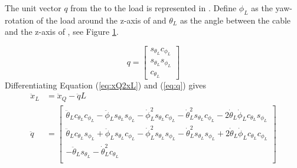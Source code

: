 The unit vector $ q $ from the  to the load is represented in \BF. Define $ \phi_L $ as the yaw-rotation of the load around the z-axis of \BF and $ \theta_L $ as the angle between the cable and the z-axis of \BF, see Figure \ref{fig:mod.modelQRLtrad}.
\begin{figure}[h!]
	\centering
	\caption{\label{fig:mod.modelQRLtrad}}
\end{figure}	

\begin{equation}\label{eq:q}
q=\begin{bmatrix}
s_{\theta_L}c_{\phi_L}\\
s_{\theta_L}s_{\phi_L}\\
c_{\theta_L}
\end{bmatrix}
\end{equation}  
Differentiating Equation (\ref{eq:xQ2xL}) and (\ref{eq:q}) gives
\begin{equation}\label{key}
\begin{aligned}
\ddot{x}_L&=\ddot{x}_Q-\ddot{q}L\\
\ddot{q}&=\begin{bmatrix}
\ddot{\theta}_Lc_{\theta_L}c_{\phi_L}-\ddot{\phi}_Ls_{\theta_L}s_{\phi_L}-\dot{\phi}_L^2s_{\theta_L}c_{\phi_L}-\dot{\theta}_L^2s_{\theta_L}c_{\phi_L}-2\dot{\theta}_L\dot{\phi}_Lc_{\theta_L}s_{\phi_L}\\
\ddot{\theta}_Lc_{\theta_L}s_{\phi_L}+\ddot{\phi}_Ls_{\theta_L}c_{\phi_L}-\dot{\phi}_L^2s_{\theta_L}s_{\phi_L}-\dot{\theta}_L^2s_{\theta_L}s_{\phi_L}+2\dot{\theta}_L\dot{\phi}_Lc_{\theta_L}c_{\phi_L}\\
-\ddot{\theta}_Ls_{\theta_L}-\dot{\theta}_L^2 c_{\theta_L}\\
\end{bmatrix}
\end{aligned}
\end{equation}

